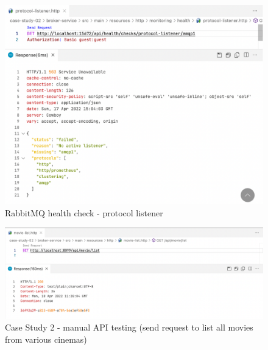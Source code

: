 \begin{figure}[H]
  \centering
  \includegraphics[width=1.0\linewidth]{./assets/images/case-studies/cs02-hc5.png}
  \caption{RabbitMQ health check - protocol listener}
  \label{fig:cs02-hc5}
\end{figure}


\begin{figure}[H]
  \centering
  \includegraphics[width=1.0\linewidth]{./assets/images/case-studies/cs02-manual-1.png}
  \caption{Case Study 2 - manual API testing (send request to list all movies from various cinemas)}
  \label{fig:cs02-manual-1}
\end{figure}

